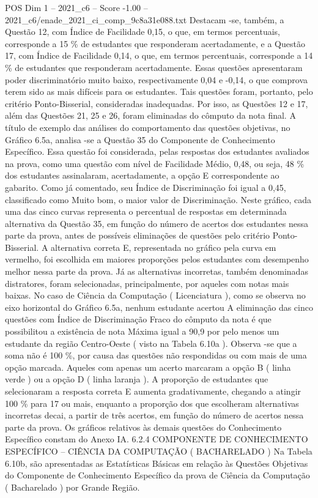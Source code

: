 \begin{textsample}{POS Dim 1 – 2021\_c6 – Score -1.00 – 2021\_c6/enade\_2021\_ci\_comp\_9c8a31e088.txt}
Destacam -se, também, a Questão 12, com Índice de Facilidade 0,15, o que, em termos percentuais, corresponde a 15 \% de estudantes que responderam acertadamente, e a Questão 17, com Índice de Facilidade 0,14, o que, em termos percentuais, corresponde a 14 \% de estudantes que responderam acertadamente.
Essas questões apresentaram poder discriminatório muito baixo, respectivamente 0,04 e -0,14, o que comprova terem sido as mais difíceis para os estudantes.
Tais questões foram, portanto, pelo critério Ponto-Bisserial, consideradas inadequadas.
Por isso, as Questões 12 e 17, além das Questões 21, 25 e 26, foram eliminadas do cômputo da nota final.
A título de exemplo das análises do comportamento das questões objetivas, no Gráfico 6.5a, analisa -se a Questão 35 do Componente de Conhecimento Específico.
Essa questão foi considerada, pelas respostas dos estudantes avaliados na prova, como uma questão com nível de Facilidade Médio, 0,48, ou seja, 48 \% dos estudantes assinalaram, acertadamente, a opção E correspondente ao gabarito.
Como já comentado, seu Índice de Discriminação foi igual a 0,45, classificado como Muito bom, o maior valor de Discriminação.
Neste gráfico, cada uma das cinco curvas representa o percentual de respostas em determinada alternativa da Questão 35, em função do número de acertos dos estudantes nessa parte da prova, antes de possíveis eliminações de questões pelo critério Ponto-Bisserial.
A alternativa correta E, representada no gráfico pela curva em vermelho, foi escolhida em maiores proporções pelos estudantes com desempenho melhor nessa parte da prova.
Já as alternativas incorretas, também denominadas distratores, foram selecionadas, principalmente, por aqueles com notas mais baixas.
No caso de Ciência da Computação ( Licenciatura ), como se observa no eixo horizontal do Gráfico 6.5a, nenhum estudante acertou A eliminação das cinco questões com Índice de Discriminação Fraco do cômputo da nota é que possibilitou a existência de nota Máxima igual a 90,9 por pelo menos um estudante da região Centro-Oeste ( visto na Tabela 6.10a ).
Observa -se que a soma não é 100 \%, por causa das questões não respondidas ou com mais de uma opção marcada.
Aqueles com apenas um acerto marcaram a opção B ( linha verde ) ou a opção D ( linha laranja ).
A proporção de estudantes que selecionaram a resposta correta E aumenta gradativamente, chegando a atingir 100 \% para 17 ou mais, enquanto a proporção dos que escolheram alternativas incorretas decai, a partir de três acertos, em função do número de acertos nessa parte da prova.
Os gráficos relativos às demais questões do Conhecimento Específico constam do Anexo IA. 6.2.4 COMPONENTE DE CONHECIMENTO ESPECÍFICO – CIÊNCIA DA COMPUTAÇÃO ( BACHARELADO ) Na Tabela 6.10b, são apresentadas as Estatísticas Básicas em relação às Questões Objetivas do Componente de Conhecimento Específico da prova de Ciência da Computação ( Bacharelado ) por Grande Região.

\end{textsample}
